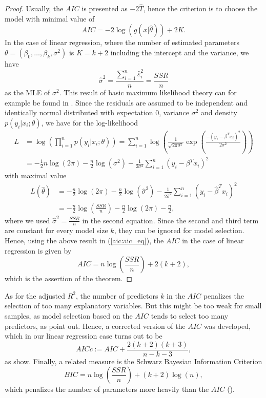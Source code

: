 \documentclass[a4paper, 12pt]{scrreprt}
\begin{document}
\begin{proof}
Usually, the $AIC$ is presented as $-2\hat{T}$, hence the criterion is to choose the model with minimal value of
\begin{equation}\label{aic:aic_eq}
AIC = -2 \log(g(x|\hat{\theta})) + 2K.
\end{equation}
In the case of linear regression, where the number of estimated parameters \linebreak $\theta = (\beta_0,\ldots, \beta_k, \sigma^2)$ is $K = k + 2$ including the intercept and the variance, we have
\[ 
\hat{\sigma}^2 = \frac{\sum_{i=1}^n \hat{\varepsilon}_i^2}{n} = \frac{SSR}{n}
\] 
as the MLE of $\sigma^2$. This result of basic maximum likelihood theory can for example be found in \textcite[chapter 2.2, p. 63]{burnham2003model}.
Since the residuals are assumed to be independent and identically normal distributed with expectation 0, variance $\sigma^2$ and density $p(y_i | x_i; \theta)$, we have for the log-likelihood
\begin{align*}
L &= \log \left( \prod_{i=1}^n p(y_i | x_i; \theta) \right)
  = \sum_{i=1}^n \log \left( \frac{1}{\sqrt{2\pi\sigma^2}} \exp \left(\frac{-(y_i - \beta^T x_i)^2}{2\sigma^2} \right)    \right) \\
  &= -\frac{1}{2} n \log(2\pi) - \frac{n}{2} \log(\sigma^2) - \frac{1}{2\sigma^2} \sum_{i=1}^n (y_i - \beta^T x_i)^2
\end{align*}
with maximal value
\begin{align*}
L(\hat{\theta}) &= -\frac{n}{2}\log(2\pi) - \frac{n}{2} \log(\hat{\sigma}^2) - \frac{1}{2 \hat{\sigma}^2} \sum_{i=1}^n (y_i - \hat{\beta}^T x_i)^2 \\
&= -\frac{n}{2} \log \left(\frac{SSR}{n} \right) - \frac{n}{2}\log(2\pi) - \frac{n}{2},
\end{align*}
where we used $\hat{\sigma}^2 = \frac{SSR}{n}$ in the second equation.
Since the second and third term are constant for every model size $k$, they can be ignored for model selection. Hence, using the above result in (\ref{aic:aic_eq}), the $AIC$ in the case of linear regression is given by
\[ 
AIC = n \log \left( \frac{SSR}{n} \right) + 2(k+2),
\]
which is the assertion of the theorem.
\end{proof}



As for the adjusted $R^2$, the number of predictors $k$ in the $AIC$ penalizes the selection of too many explanatory variables. But this might be too weak for small samples, as model selection based on the $AIC$ tends to select too many predictors, as \textcite[chapter 7.7.3]{burnham2003model} point out.
Hence, a corrected version of the $AIC$ was developed, which in our linear regression case turns out to be
\[ 
AICc := AIC + \frac{2(k+2)(k+3)}{n-k-3}, 
\]
as \textcite[chapter 7.7]{burnham2003model} show.
Finally, a related measure is the Schwarz Bayesian Information Criterion
\begin{equation*}
BIC = n\log\left(\frac{SSR}{n}\right) + (k+2)\log(n),
\end{equation*}
which penalizes the number of parameters more heavily than the $AIC$ (\textcite[chapter 5.3]{hyndman2014forecasting}).
\end{document}
